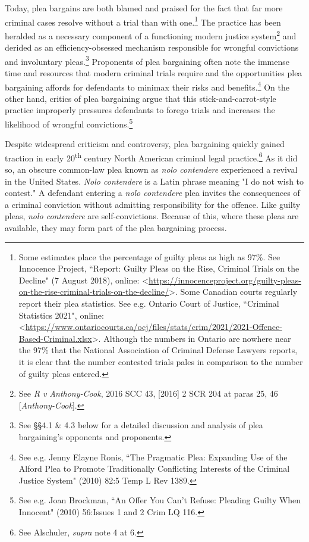 Today, plea bargains are both blamed and praised for the fact that far more criminal cases resolve without a trial than with one.\footnote{Some estimates place the percentage of guilty pleas as high as 97\%. See Innocence Project, ``Report: Guilty Pleas on the Rise, Criminal Trials on the Decline" (7 August 2018), online: \textless \url{https://innocenceproject.org/guilty-pleas-on-the-rise-criminal-trials-on-the-decline/}\textgreater. Some Canadian courts regularly report their plea statistics. See e.g. Ontario Court of Justice, ``Criminal Statistics 2021", online: \textless \url{https://www.ontariocourts.ca/ocj/files/stats/crim/2021/2021-Offence-Based-Criminal.xlsx}\textgreater. Although the numbers in Ontario are nowhere near the 97\% that the National Association of Criminal Defense Lawyers reports, it is clear that the number contested trials pales in comparison to the number of guilty pleas entered.} The practice has been heralded as a necessary component of a functioning modern justice system\footnote{See \textit{R v Anthony-Cook}, 2016 SCC 43, [2016] 2 SCR 204 at paras 25, 46 [\textit{Anthony-Cook}].} and derided as an efficiency-obsessed mechanism responsible for wrongful convictions and involuntary pleas.\footnote{See \S\S 4.1 \& 4.3 below for a detailed discussion and analysis of plea bargaining's opponents and proponents.} Proponents of plea bargaining often note the immense time and resources that modern criminal trials require and the opportunities plea bargaining affords for defendants to minimax their risks and benefits.\footnote{See e.g. Jenny Elayne Ronis, ``The Pragmatic Plea: Expanding Use of the Alford Plea to Promote Traditionally Conflicting Interests of the Criminal Justice System" (2010) 82:5 Temp L Rev 1389.} On the other hand, critics of plea bargaining argue that this stick-and-carrot-style practice improperly pressures defendants to forego trials and increases the likelihood of wrongful convictions.\footnote{See e.g. Joan Brockman, ``An Offer You Can't Refuse: Pleading Guilty When Innocent" (2010) 56:Issues 1 and 2 Crim LQ 116.}

Despite widespread criticism and controversy, plea bargaining quickly gained traction in early 20\textsuperscript{th} century North American criminal legal practice.\footnote{See Alschuler, \textit{supra} note 4 at 6.} As it did so, an obscure common-law plea known as \textit{nolo contendere} experienced a revival in the United States. \textit{Nolo contendere} is a Latin phrase meaning "I do not wish to contest." A defendant entering a \textit{nolo contendere} plea invites the consequences of a criminal conviction without admitting responsibility for the offence. Like guilty pleas, \textit{nolo contendere} are self-convictions. Because of this, where these pleas are available, they may form part of the plea bargaining process. 

